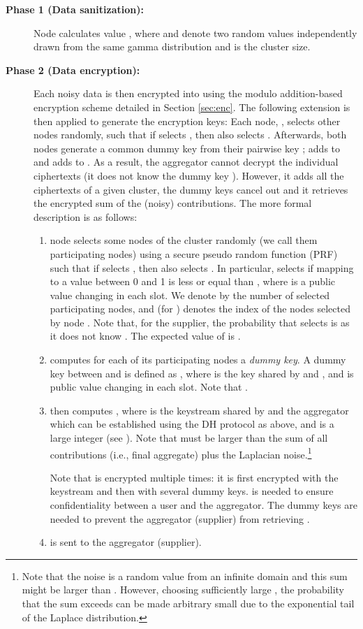 \documentclass[11pt,a4paper]{article}
\theoremstyle{plain}
\theoremstyle{plain}
\theoremstyle{plain}
\theoremstyle{plain}
\theoremstyle{nonumberplain} \theoremseparator{}
\begin{document}
\begin{description}
\item[\textbf{Phase 1 (Data sanitization):}]  
Node  calculates value 
, 
where  and  denote two random 
values independently drawn from the same gamma distribution and  is the cluster size. 


\item[\textbf{Phase 2 (Data encryption):}]  
Each noisy data  is then encrypted into   using the modulo addition-based encryption scheme detailed in Section \ref{sec:enc}. The following extension is then applied to generate the encryption keys:
Each node, , selects  other nodes randomly, such that if  selects , then  also selects . 
Afterwards, both nodes generate a common dummy key  from their pairwise key ;  adds  
to  and  adds  to . 
As a result, the aggregator cannot decrypt the individual ciphertexts (it does not know the dummy key ). However, it adds all
the ciphertexts of a given cluster, the dummy keys cancel out and it retrieves the encrypted sum of the (noisy) contributions.
The more formal description is as follows:

\begin{enumerate} 
\item node  selects some nodes of the cluster randomly (we call them participating nodes) using a secure pseudo random function (PRF) such that if  selects , then  also selects . 
In particular,  selects  if mapping  to a value between 0 and 1 is less or equal than , where  is a public value changing in each slot.
We denote by  the number of selected participating nodes, and  (for )  denotes the index of the  nodes selected by node . Note that, for the supplier, the probability that  selects  is  as it does not know . The expected value of  is .

\item  computes for each of its  participating nodes a {\em dummy key}. A dummy key between  and  is defined as , where  is 
the key shared by  and , and  is public value changing in each slot.  Note that .

\item  then computes 
, where  is the keystream shared by  and the aggregator which can be established using the DH protocol as above, and  is a large integer (see \cite{cc05mobiquitous}). Note that  must be larger than the sum of all contributions (i.e., final aggregate) plus the Laplacian noise.\footnote{Note that the noise is a random value from an infinite domain and this sum might be larger than . However, choosing sufficiently large , the probability that the sum exceeds  can be made arbitrary small due to the exponential tail of the Laplace distribution.}  

Note that  is encrypted multiple times: it is first encrypted with the keystream 
and then with several dummy keys.  is needed to ensure confidentiality between a user and the aggregator. 
The dummy keys are needed to prevent the aggregator (supplier) from retrieving .
\item  is sent to the aggregator (supplier).
\end{enumerate}
\end{description}
\end{document}
